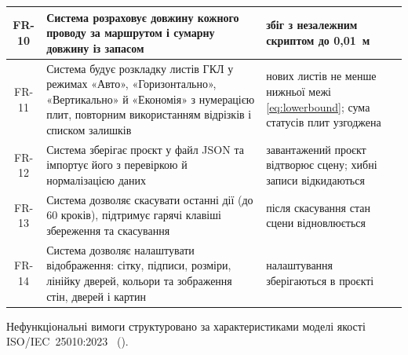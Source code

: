\begin{spacing}{1.15}
\begin{xltabular}{\textwidth}{| c | >{\raggedright\arraybackslash}X | >{\raggedright\arraybackslash}X |}
    FR-10 & Система розраховує довжину кожного проводу за маршрутом і сумарну довжину із запасом & збіг з незалежним скриптом до 0,01~м \\ \hline
    FR-11 & Система будує розкладку листів ГКЛ у режимах «Авто», «Горизонтально», «Вертикально» й «Економія» з нумерацією плит, повторним використанням відрізків і списком залишків & нових листів не менше нижньої межі \eqref{eq:lowerbound}; сума статусів плит узгоджена \\ \hline
    FR-12 & Система зберігає проєкт у файл JSON та імпортує його з перевіркою й нормалізацією даних & завантажений проєкт відтворює сцену; хибні записи відкидаються \\ \hline
    FR-13 & Система дозволяє скасувати останні дії (до 60 кроків), підтримує гарячі клавіші збереження та скасування & після скасування стан сцени відновлюється \\ \hline
    FR-14 & Система дозволяє налаштувати відображення: сітку, підписи, розміри, лінійку дверей, кольори та зображення стін, дверей і картин & налаштування зберігаються в проєкті \\ \hline
\end{xltabular}
\end{spacing}


Нефункціональні вимоги структуровано за характеристиками моделі якості ISO/IEC~25010:2023~ ().

